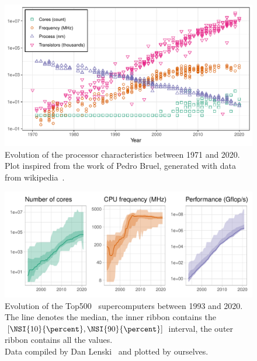     \label{sec:exponential_growth}


        \begin{figure}[htbp]
            \centering
            \includegraphics[width=\textwidth]{img/context/49_years.pdf}
            \caption{\label{fig:context:49_years}
            Evolution of the processor characteristics between 1971 and 2020. Plot inspired from the work of Pedro Bruel,
            generated with data from wikipedia~\cite{wiki2021chronology,wiki2021transistor}.}
        \end{figure}


        \begin{figure}[htbp]
            \centering
            \includegraphics[width=\textwidth]{img/context/top500.pdf}
            \caption{\label{fig:context:top500}
            Evolution of the Top500~\cite{top500} supercomputers between 1993 and 2020.  The line denotes the median, the inner ribbon
            contains the \([\NSI{10}{\percent}, \NSI{90}{\percent}]\) interval, the outer ribbon contains all the
            values.\\ Data compiled by Dan Lenski~\cite{top500_compiled} and plotted by ourselves.}
        \end{figure}


